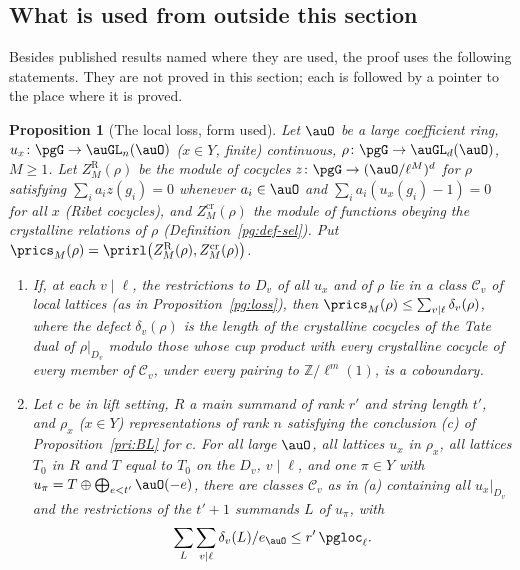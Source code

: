 \documentclass[10pt]{amsart}
\newtheorem{proposition}[theorem]{Proposition}
\theoremstyle{definition}
\theoremstyle{remark}
\newcommand{\Z}{\mathbb Z}
\begin{document}
\subsection{What is used from outside this section}\label{pri:ss-inputs}

Besides published results named where they are used, the proof uses the following statements. They
are not proved in this section; each is followed by a pointer to the place where it is proved.

\begin{proposition}[The local loss, form used]\label{pri:loss}
Let $\auO$ be a large coefficient ring, $u_x\colon\pgG\to\auGL_n(\auO)$ ($x\in Y$, finite)
continuous, $\rho\colon\pgG\to\auGL_{d}(\auO)$, $M\ge1$. Let $Z^{\mathrm R}_M(\rho)$ be the module of
cocycles $z\colon\pgG\to(\auO/\ell^M)^d$ for $\rho$ satisfying $\sum_ia_iz(g_i)=0$ whenever
$a_i\in\auO$ and $\sum_ia_i(u_x(g_i)-1)=0$ for all $x$ (\emph{Ribet cocycles}), and
$Z^{\mathrm{cr}}_M(\rho)$ the module of functions obeying the crystalline relations of $\rho$
(Definition~\ref{pg:def-sel}). Put $\prics_M(\rho)=\prirl\bigl(Z^{\mathrm R}_M(\rho),
Z^{\mathrm{cr}}_M(\rho)\bigr)$.
\begin{enumerate}
\item[(a)] If, at each $v\mid\ell$, the restrictions to $D_v$ of all $u_x$ and of $\rho$ lie in a
class $\mathcal C_v$ of local lattices (as in Proposition~\ref{pg:loss}), then
$\prics_M(\rho)\le\sum_{v\mid\ell}\delta_v(\rho)$, where the \emph{defect} $\delta_v(\rho)$ is the
length of the crystalline cocycles of the Tate dual of $\rho|_{D_v}$ modulo those whose cup product
with every crystalline cocycle of every member of $\mathcal C_v$, under every pairing to
$\Z/\ell^m(1)$, is a coboundary.
\item[(b)] Let $c$ be in lift setting, $R$ a main summand of rank $r'$ and string length $t'$,
and $\rho_x$ ($x\in Y$) representations of rank $n$ satisfying the conclusion (c) of
Proposition~\ref{pri:BL} for $c$. For all large $\auO$, all lattices $u_x$ in $\rho_x$, all
lattices $T_0$ in $R$ and $T$ equal to $T_0$ on the $D_v$, $v\mid\ell$, and one $\pi\in Y$ with
$u_\pi=T\oplus\bigoplus_{e<t'}\auO(-e)$, there are classes $\mathcal C_v$ as in (a) containing all
$u_x|_{D_v}$ and the restrictions of the $t'+1$ summands $L$ of $u_\pi$, with
\[
\sum_{L}\sum_{v\mid\ell}\delta_v(L)/e_\auO\le r'\,\pgloc_\ell .
\]
\end{enumerate}
\end{proposition}
\end{document}

